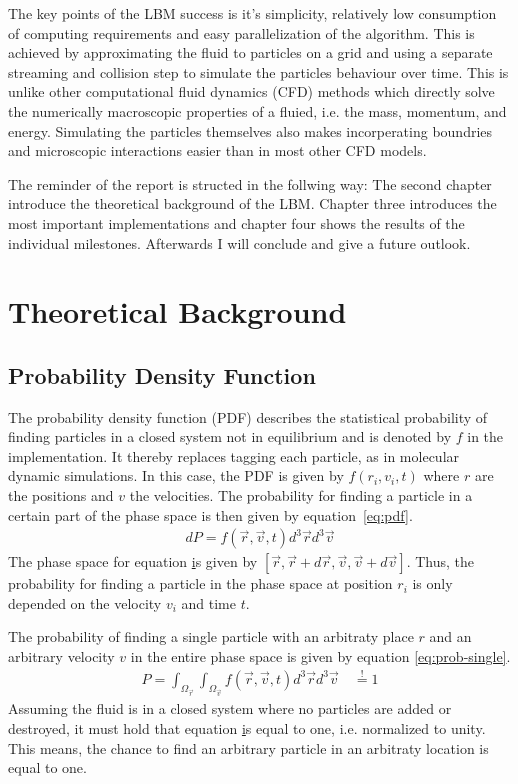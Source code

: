 \documentclass[a4paper,11pt, oneside]{book}
\begin{document}
The key points of the LBM success is it's simplicity, relatively low consumption of computing requirements and easy parallelization of the algorithm.
This is achieved by approximating the fluid to particles on a grid and using a separate streaming and collision step to simulate the particles behaviour over time.
This is unlike other computational fluid dynamics (CFD) methods which directly solve the numerically macroscopic properties of a fluied, i.e. the mass, momentum, and energy.
Simulating the particles themselves also makes incorperating boundries and microscopic interactions easier than in most other CFD models.

The reminder of the report is structed in the follwing way: The second chapter introduce the theoretical background of the LBM. Chapter three introduces the most important implementations and chapter four shows the results of the individual milestones.
Afterwards I will conclude and give a future outlook.

\chapter{Theoretical Background}
\section{Probability Density Function}
The probability density function (PDF) describes the statistical probability of finding particles in a closed system not in equilibrium and is denoted by $f$ in the implementation.
It thereby replaces tagging each particle, as in molecular dynamic simulations.
In this case, the PDF is given by $f(r_i,v_i,t)$ where $r$ are the positions and $v$ the velocities.
The probability for finding a particle in a certain part of the phase space is then given by equation~\ref{eq:pdf}.
\begin{equation}
  \label{eq:pdf}
  \begin{aligned}
    dP = f(\vec{r},\vec{v},t) d^{3}\vec{r} d^{3}\vec{v}
  \end{aligned}
\end{equation}
The phase space for equation \href{eq:pdf} is given by $[\vec{r}, \vec{r}+d\vec{r}, \vec{v}, \vec{v}+d\vec{v}]$.
Thus, the probability for finding a particle in the phase space at position $r_i$ is only depended on the velocity $v_i$ and time $t$.

The probability of finding a single particle with an arbitraty place $r$ and an arbitrary velocity $v$ in the entire phase space is given by equation \ref{eq:prob-single}.
\begin{equation}
  \label{eq:prob-single}
  \begin{aligned}
    P = \int_{\Omega_{\vec{r}}} \int_{\Omega_{\vec{v}}}  f(\vec{r},\vec{v},t) d^{3}\vec{r} d^{3}\vec{v} \quad \overset{!}{=} 1
  \end{aligned}
\end{equation}
Assuming the fluid is in a closed system where no particles are added or destroyed, it must hold that equation \href{eq:prob-single} is equal to one, i.e. normalized to unity. 
This means, the chance to find an arbitrary particle in an arbitraty location is equal to one.
\end{document}
